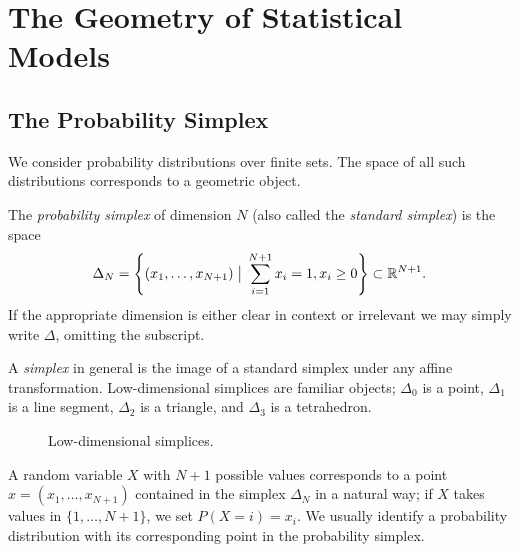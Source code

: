 \documentclass[cclicense]{hmcthesis}
\newcommand*{\vbar}{\;\big\vert\;}
\numberwithin{equation}{chapter}
\numberwithin{thmcounter}{chapter}
\begin{document}
\chapter{The Geometry of Statistical Models}
    \section{The Probability Simplex}

    We consider probability distributions over finite sets.  The space of all
    such distributions corresponds to a geometric object.
    
    \begin{definition} 
        The \emph{probability simplex} of dimension $N$ (also
        called the \emph{standard simplex}) is the space
        \[
            \Delta_N = 
            \left\{(x_1, \ldots, x_{N+1}) \vbar \sum_{i=1}^{N+1} x_i= 1, x_i \ge 0 \right\} 
            \subset
            \R^{N+1}.
        \]
        If the appropriate dimension is either clear in context or irrelevant we
        may simply write $\Delta$, omitting the subscript.
    \end{definition}
    A \emph{simplex} in general is the image of a standard simplex under any
    affine transformation.  Low-dimensional simplices are familiar objects;
    $\Delta_0$ is a point, $\Delta_1$ is a line segment, $\Delta_2$ is a
    triangle, and $\Delta_3$ is a tetrahedron.
    \begin{figure}[H]
        \centering
        \caption{Low-dimensional simplices.}
    \end{figure}
    \noindent A random variable $X$ with $N+1$ possible values corresponds to a point $x =
    (x_1, \ldots, x_{N+1})$ contained in the simplex $\Delta_N$ in a natural
    way; if $X$ takes values in $\{1, \ldots, N+1\}$, we set $P(X = i) = x_i$.
    We usually identify a probability distribution with its corresponding
    point in the probability simplex.  
    
\end{document}
